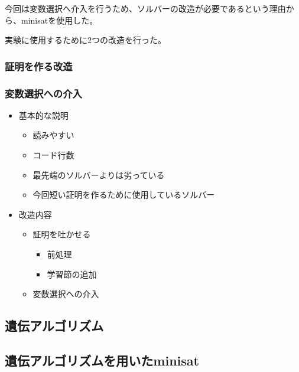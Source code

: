 \documentclass[titlepage]{jsarticle}
\begin{document}
今回は変数選択へ介入を行うため、ソルバーの改造が必要であるという理由から、minisatを使用した。

実験に使用するために2つの改造を行った。

\subsubsection{証明を作る改造}



\subsubsection{変数選択への介入}



\begin{itemize}
	\item 基本的な説明
	\begin{itemize}
		\item 読みやすい
		\item コード行数
		\item 最先端のソルバーよりは劣っている
		\item 今回短い証明を作るために使用しているソルバー
	\end{itemize}
	\item 改造内容
	\begin{itemize}
		\item 証明を吐かせる
		\begin{itemize}
			\item 前処理
			\item 学習節の追加
		\end{itemize}
		\item 変数選択への介入
	\end{itemize}
\end{itemize}





\subsection{遺伝アルゴリズム}





\subsection{遺伝アルゴリズムを用いたminisat}
\end{document}
